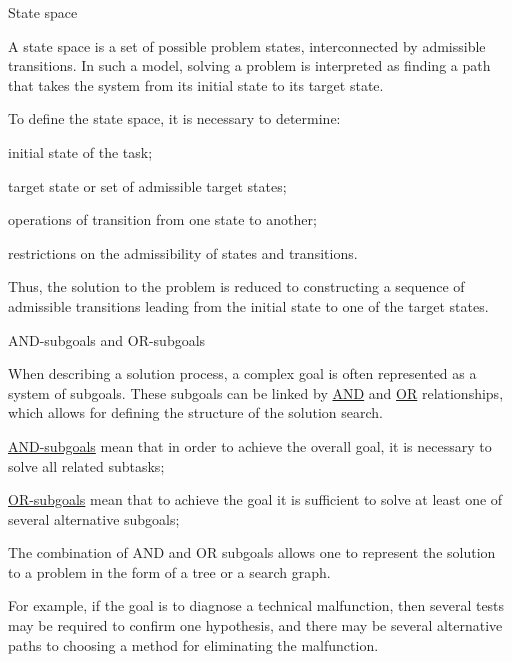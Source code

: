 \begin{frame}{State space}
	\topline
	\justifying
	
	\footnotesize
	\vspace{10mm}
	
	A state space is a set of possible problem states, interconnected by admissible transitions. In such a model, solving a problem is interpreted as finding a path that takes the system from its initial state to its target state.
	
	\vspace{2mm}
	
	To define the state space, it is necessary to determine:
	\begin{textitemize}
		\item initial state of the task;
		\item target state or set of admissible target states;
		\item operations of transition from one state to another;
		\item restrictions on the admissibility of states and transitions.
	\end{textitemize}
	
	\vspace{2mm}
	
	Thus, the solution to the problem is reduced to constructing a sequence of admissible transitions leading from the initial state to one of the target states.
\end{frame}

\begin{frame}{AND-subgoals and OR-subgoals}
	\topline
	\justifying
	
	\footnotesize
	\vspace{10mm}
	
	When describing a solution process, a complex goal is often represented as a system of subgoals. These subgoals can be linked by \uline{AND} and \uline{OR} relationships, which allows for defining the structure of the solution search.
	
	\vspace{2mm}
	
	\begin{textitemize}
		\item \uline{AND-subgoals} mean that in order to achieve the overall goal, it is necessary to solve all related subtasks;
		\item \uline{OR-subgoals} mean that to achieve the goal it is sufficient to solve at least one of several alternative subgoals;
		\item The combination of AND and OR subgoals allows one to represent the solution to a problem in the form of a tree or a search graph.
	\end{textitemize}
	
	\vspace{2mm}
	
	For example, if the goal is to diagnose a technical malfunction, then several tests may be required to confirm one hypothesis, and there may be several alternative paths to choosing a method for eliminating the malfunction.
\end{frame}


